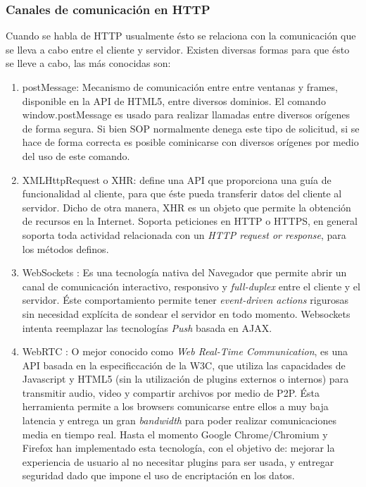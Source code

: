         \subsubsection{Canales de comunicación en HTTP}
        \label{chap2:comunHTTP}
        Cuando se habla de HTTP usualmente ésto se relaciona con la comunicación que se lleva a cabo entre el cliente y servidor. Existen diversas formas para que ésto se lleve a cabo, las más conocidas son:
        \begin{enumerate}
            \item postMessage: Mecanismo de comunicación entre entre ventanas y frames, disponible en la API de HTML5, entre diversos dominios. El comando window.postMessage es usado para realizar llamadas entre diversos orígenes de forma segura. Si bien SOP normalmente denega este tipo de solicitud, si se hace de forma correcta es posible cominicarse con diversos orígenes por medio del uso de este comando.

            \item XMLHttpRequest o XHR: \cite{XHR} define una API que proporciona una guía de funcionalidad al cliente, para que éste pueda transferir datos del cliente al servidor. Dicho de otra manera, XHR es un objeto que permite la obtención de recursos en la Internet. Soporta peticiones en HTTP o HTTPS, en general soporta toda actividad relacionada con un \textit{HTTP request or response}, para los métodos definos.

            \item WebSockets \cite{WebSocket}: Es una tecnología nativa del Navegador que permite abrir un canal de comunicación interactivo, responsivo y \textit{full-duplex} entre el cliente y el servidor. Éste comportamiento permite tener \textit{event-driven actions} rigurosas sin necesidad explícita de sondear el servidor en todo momento. Websockets intenta reemplazar las tecnologías \textit{Push} basada en AJAX.

            \item WebRTC \cite{WebRTC}: O mejor conocido como \textit{Web Real-Time Communication}, es una API basada en la especificcación de la W3C, que utiliza las capacidades de Javascript y HTML5 (sin la utilización de plugins externos o internos) para transmitir audio, video y compartir archivos por medio de P2P. Ésta herramienta permite a los browsers comunicarse entre ellos a muy baja latencia y entrega un gran \textit{bandwidth} para poder realizar comunicaciones media en tiempo real. Hasta el momento Google Chrome/Chromium y Firefox han implementado esta tecnología, con el objetivo de: mejorar la experiencia de usuario al no necesitar plugins para ser usada, y entregar seguridad dado que impone el uso de encriptación en los datos.
        \end{enumerate}

